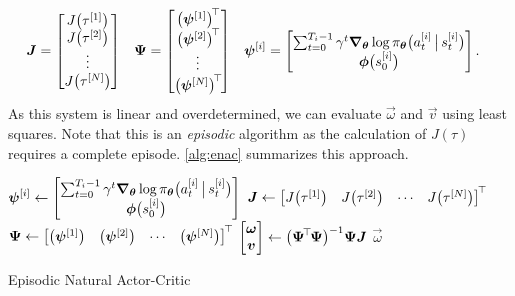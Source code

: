 			\begin{align}
				\bm{J} &= \begin{bmatrix} J\bigl( \tau^{[1]} \bigr) \\ J\bigl( \tau^{[2]} \bigr) \\ \vdots \\ J\bigl( \tau^{[N]} \bigr) \end{bmatrix} &
				\bm{\mathrm{\Psi}} &= \begin{bmatrix} \bigl(\bm{\psi}^{[1]}\bigr)^{\!\top\!} \\ \bigl(\bm{\psi}^{[2]}\bigr)^{\!\top\!} \\ \vdots \\ \bigl(\bm{\psi}^{[N]}\bigr)^{\!\top\!} \end{bmatrix} &
				\bm{\psi}^{[i]} &= \begin{bmatrix} \sum_{t = 0}^{T_i - 1} \gamma^t \grad_{\bm{\theta}} \log \pi_{\bm{\theta}}\bigl( a_t^{[i]} \,\big\vert\, s_t^{[i]} \bigr) \\ \bm{\phi}\bigl(s_0^{[i]}\bigr) \end{bmatrix}.
			\end{align}
			As this system is linear and overdetermined, we can evaluate \(\vec{\omega}\) and \(\vec{v}\) using least squares. Note that this is an \emph{episodic} algorithm as the calculation of \(J(\tau)\) requires a complete episode. \autoref{alg:enac} summarizes this approach.

			\begin{algorithm}  \DontPrintSemicolon
				\(\displaystyle \bm{\psi}^{[i]} \gets \begin{bmatrix} \sum_{t = 0}^{T_i - 1} \gamma^t \grad_{\bm{\theta}} \log \pi_{\bm{\theta}}\bigl( a_t^{[i]} \,\big\vert\, s_t^{[i]} \bigr) \\ \bm{\phi}\bigl(s_0^{[i]}\bigr) \end{bmatrix} \) \;
				\(\displaystyle \bm{J} \gets \begin{bmatrix} J\bigl( \tau^{[1]} \bigr) & J\bigl( \tau^{[2]} \bigr) & \cdots & J\bigl( \tau^{[N]} \bigr) \end{bmatrix}^{\!\top\!} \) \;
				\(\displaystyle \bm{\mathrm{\Psi}} \gets \begin{bmatrix} \bigl(\bm{\psi}^{[1]}\bigr) & \bigl(\bm{\psi}^{[2]}\bigr) & \cdots & \bigl(\bm{\psi}^{[N]}\bigr) \end{bmatrix}^{\!\top\!} \) \;
				\(\displaystyle \begin{bmatrix} \bm{\omega} \\ \bm{v} \end{bmatrix} \gets \bigl( \bm{\mathrm{\Psi}}^{\!\top\!} \bm{\mathrm{\Psi}} \bigr)^{-1} \bm{\mathrm{\Psi}} \bm{J} \) \;
				\Return \( \vec{\omega} \) \;
				\caption{Episodic Natural Actor-Critic}
				\label{alg:enac}
			\end{algorithm}

